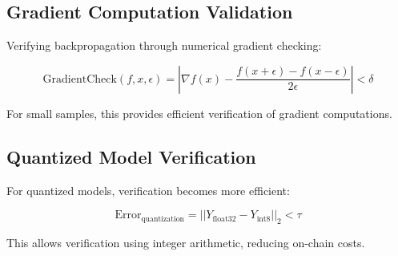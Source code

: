 \subsection{Gradient Computation Validation}

Verifying backpropagation through numerical gradient checking:

\begin{equation}
\text{GradientCheck}(f, x, \epsilon) = \left|\nabla f(x) - \frac{f(x+\epsilon) - f(x-\epsilon)}{2\epsilon}\right| < \delta
\end{equation}

For small samples, this provides efficient verification of gradient computations.

\subsection{Quantized Model Verification}

For quantized models, verification becomes more efficient:

\begin{equation}
\text{Error}_{\text{quantization}} = ||Y_{\text{float32}} - Y_{\text{int8}}||_2 < \tau
\end{equation}

This allows verification using integer arithmetic, reducing on-chain costs.

